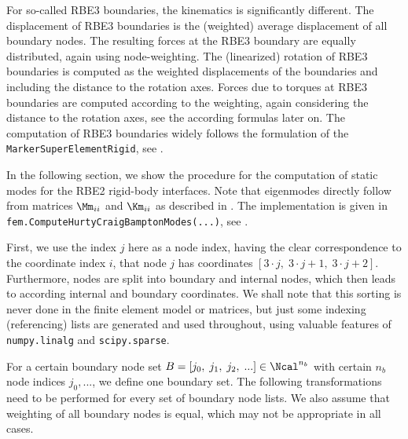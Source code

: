 For so-called RBE3 boundaries, the kinematics is significantly different. The displacement of RBE3 boundaries is the (weighted) average displacement of all boundary nodes. The resulting forces at the RBE3 boundary are equally distributed, again using node-weighting.
The (linearized) rotation of RBE3 boundaries is computed as the weighted displacements of the boundaries and including the distance to the rotation axes. 
Forces due to torques at RBE3 boundaries are computed according to the weighting, again considering the distance to the rotation axes, see the according formulas later on. The computation of RBE3 boundaries widely follows the formulation of the \texttt{MarkerSuperElementRigid}, see .

In the following section, we show the procedure for the computation of static modes for the RBE2 rigid-body interfaces.
Note that eigenmodes directly follow from matrices $\Mm_{ii}$ and $\Km_{ii}$ as described in .
The implementation is given in \texttt{fem.ComputeHurtyCraigBamptonModes(...)}, see .

First, we use the index $j$ here as a node index, having the clear correspondence to the coordinate index $i$, that node $j$ has coordinates 
$[3\cdot j,\; 3\cdot j+1,\; 3\cdot j+2]$.
Furthermore, nodes are split into boundary and internal nodes, which then leads to according internal and boundary coordinates.
We shall note that this sorting is never done in the finite element model or matrices, but just some indexing (referencing) lists are generated and used throughout, using valuable features of \texttt{numpy.linalg} and \texttt{scipy.sparse}.

For a certain boundary node set $B=[j_0, \; j_1, \; j_2, \; ...] \in \Ncal^{n_b}$ with certain $n_b$ node indices $j_0, ...$, we define one boundary set. The following transformations need to be performed for every set of boundary node lists. We also assume that weighting of all boundary nodes is equal, which may not be appropriate in all cases.

